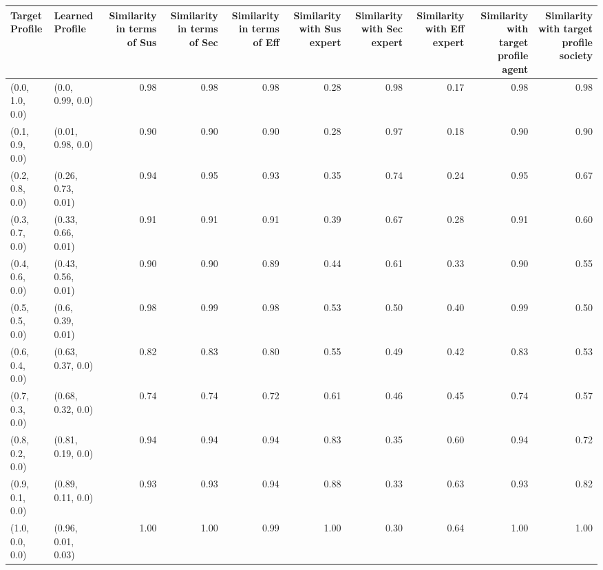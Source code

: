 \begin{tabular}{llrrrrrrrr}
\toprule
Target Profile & Learned Profile & Similarity in terms of Sus & Similarity in terms of Sec & Similarity in terms of Eff & Similarity with Sus expert & Similarity with Sec expert & Similarity with Eff expert & Similarity with target profile agent & Similarity with target profile society \\
\midrule
(0.0, 1.0, 0.0) & (0.0, 0.99, 0.0) & 0.98 & 0.98 & 0.98 & 0.28 & 0.98 & 0.17 & 0.98 & 0.98 \\
(0.1, 0.9, 0.0) & (0.01, 0.98, 0.0) & 0.90 & 0.90 & 0.90 & 0.28 & 0.97 & 0.18 & 0.90 & 0.90 \\
(0.2, 0.8, 0.0) & (0.26, 0.73, 0.01) & 0.94 & 0.95 & 0.93 & 0.35 & 0.74 & 0.24 & 0.95 & 0.67 \\
(0.3, 0.7, 0.0) & (0.33, 0.66, 0.01) & 0.91 & 0.91 & 0.91 & 0.39 & 0.67 & 0.28 & 0.91 & 0.60 \\
(0.4, 0.6, 0.0) & (0.43, 0.56, 0.01) & 0.90 & 0.90 & 0.89 & 0.44 & 0.61 & 0.33 & 0.90 & 0.55 \\
(0.5, 0.5, 0.0) & (0.6, 0.39, 0.01) & 0.98 & 0.99 & 0.98 & 0.53 & 0.50 & 0.40 & 0.99 & 0.50 \\
(0.6, 0.4, 0.0) & (0.63, 0.37, 0.0) & 0.82 & 0.83 & 0.80 & 0.55 & 0.49 & 0.42 & 0.83 & 0.53 \\
(0.7, 0.3, 0.0) & (0.68, 0.32, 0.0) & 0.74 & 0.74 & 0.72 & 0.61 & 0.46 & 0.45 & 0.74 & 0.57 \\
(0.8, 0.2, 0.0) & (0.81, 0.19, 0.0) & 0.94 & 0.94 & 0.94 & 0.83 & 0.35 & 0.60 & 0.94 & 0.72 \\
(0.9, 0.1, 0.0) & (0.89, 0.11, 0.0) & 0.93 & 0.93 & 0.94 & 0.88 & 0.33 & 0.63 & 0.93 & 0.82 \\
(1.0, 0.0, 0.0) & (0.96, 0.01, 0.03) & 1.00 & 1.00 & 0.99 & 1.00 & 0.30 & 0.64 & 1.00 & 1.00 \\
\bottomrule
\end{tabular}
